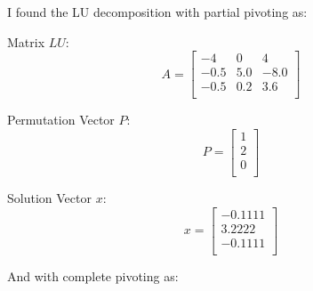 \documentclass[12pt, letterpaper]{article}
\begin{document}
I found the LU decomposition with partial pivoting as:

\begin{minipage}{0.3\textwidth}
   \centering
   Matrix $LU$:
   \[
   A = \begin{bmatrix}
   -4 & 0 & 4 \\
   -0.5 & 5.0 & -8.0 \\
   -0.5 & 0.2 & 3.6 \\
   \end{bmatrix}
   \]
\end{minipage}
\hfill
\begin{minipage}{0.3\textwidth}
   \centering
   Permutation Vector $P$:
   \[
   P = \begin{bmatrix}
   1 \\
   2 \\
   0 \\
   \end{bmatrix}
   \]
\end{minipage}
\hfill
\begin{minipage}{0.3\textwidth}
   \centering
   Solution Vector $x$:
   \[
   x = \begin{bmatrix}
   -0.1111 \\
   3.2222 \\
   -0.1111 \\
   \end{bmatrix}
   \]
\end{minipage}

And with complete pivoting as:
\end{document}
